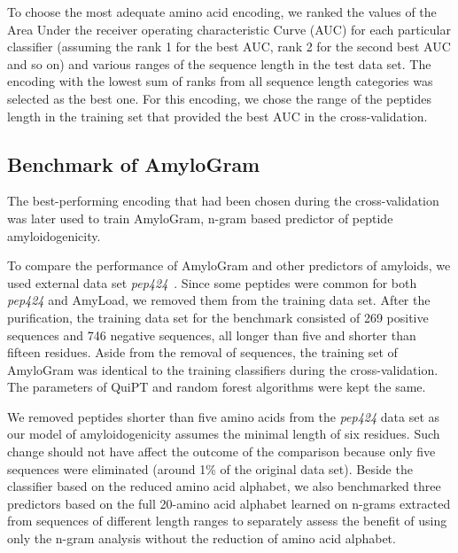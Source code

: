 \documentclass[fleqn,10pt,twoside]{gcb15submission}
\begin{document}
  To choose the most adequate amino acid encoding, we ranked the values of the 
Area Under the receiver operating characteristic Curve (AUC) for each particular 
classifier (assuming the rank 1 for the best AUC, rank 2 for the second best AUC 
and so on) and various ranges of the sequence length in the test data set. The 
encoding with the lowest sum of ranks from all sequence length categories was 
selected as the best one. For this encoding, we chose the range of the peptides 
length in the training set that provided the best AUC in the cross-validation. 

\subsection{Benchmark of AmyloGram}

The best-performing encoding that had been chosen during the cross-validation was later used 
%
%
%
%
%
to train AmyloGram, n-gram based predictor of peptide amyloidogenicity.

  To compare the performance of AmyloGram and other predictors of amyloids, we 
used external data set \textit{pep424}~\citep{walsh_pasta_2014}. Since some 
peptides were common for both \textit{pep424} and AmyLoad, we removed them from 
the training data set. After the purification, the training data set for 
%
%
%
the benchmark consisted of 269 positive sequences and 746 negative 
sequences, all longer than five and shorter than fifteen residues. Aside from the 
removal of sequences, the training set of AmyloGram was identical to the training 
%
%
%
classifiers during the cross-validation. The parameters of QuiPT and random forest 
algorithms were kept the same.

  We removed peptides shorter than five amino acids from the \textit{pep424} 
data set as our model of amyloidogenicity assumes the minimal length of six 
residues. Such change should not have affect the outcome of the comparison because 
only five sequences were eliminated (around 1\% of the original data set). 
Beside the classifier based on the reduced amino acid alphabet, we also 
benchmarked three predictors based on the full 20-amino acid alphabet learned on 
n-grams extracted from sequences of different length ranges to separately 
assess the benefit of using only the n-gram analysis without the reduction of 
amino acid alphabet.
\end{document}
